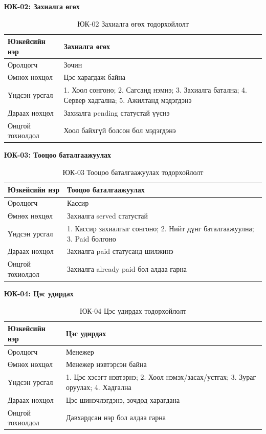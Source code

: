 \textbf{ЮК-02: Захиалга өгөх}

\begin{table}[htbp]
\caption{ЮК-02 Захиалга өгөх тодорхойлолт}
\label{tab:uc02}
\centering
\small
\begin{tabularx}{\textwidth}{|L|L|}
\hline
{}
Юзкейсийн нэр & Захиалга өгөх \\ \hline
Оролцогч & Зочин \\ \hline
{}
Өмнөх нөхцөл & Цэс харагдаж байна \\ \hline
Үндсэн урсгал & 1. Хоол сонгоно; 2. Сагсанд нэмнэ; 3. Захиалга батална; 4. Сервер хадгална; 5. Ажилтанд мэдэгдэнэ \\ \hline
{}
Дараах нөхцөл & Захиалга pending статустай үүснэ \\ \hline
Онцгой тохиолдол & Хоол байхгүй болсон бол мэдэгдэнэ \\ \hline
\end{tabularx}
\end{table}

\textbf{ЮК-03: Тооцоо баталгаажуулах}

\begin{table}[htbp]
\caption{ЮК-03 Тооцоо баталгаажуулах тодорхойлолт}
\label{tab:uc03}
\centering
\small
\begin{tabularx}{\textwidth}{|L|L|}
\hline
{}
Юзкейсийн нэр & Тооцоо баталгаажуулах \\ \hline
Оролцогч & Кассир \\ \hline
{}
Өмнөх нөхцөл & Захиалга served статустай \\ \hline
Үндсэн урсгал & 1. Кассир захиалгыг сонгоно; 2. Нийт дүнг баталгаажуулна; 3. Paid болгоно \\ \hline
{}
Дараах нөхцөл & Захиалга paid статусанд шилжинэ \\ \hline
Онцгой тохиолдол & Захиалга already paid бол алдаа гарна \\ \hline
\end{tabularx}
\end{table}

\textbf{ЮК-04: Цэс удирдах}

\begin{table}[htbp]
\caption{ЮК-04 Цэс удирдах тодорхойлолт}
\label{tab:uc04}
\centering
\small
\begin{tabularx}{\textwidth}{|L|L|}
\hline
{}
Юзкейсийн нэр & Цэс удирдах \\ \hline
Оролцогч & Менежер \\ \hline
{}
Өмнөх нөхцөл & Менежер нэвтэрсэн байна \\ \hline
Үндсэн урсгал & 1. Цэс хэсэгт нэвтэрнэ; 2. Хоол нэмэх/засах/устгах; 3. Зураг оруулах; 4. Хадгална \\ \hline
{}
Дараах нөхцөл & Цэс шинэчлэгдэнэ, зочдод харагдана \\ \hline
Онцгой тохиолдол & Давхардсан нэр бол алдаа гарна \\ \hline
\end{tabularx}
\end{table}

